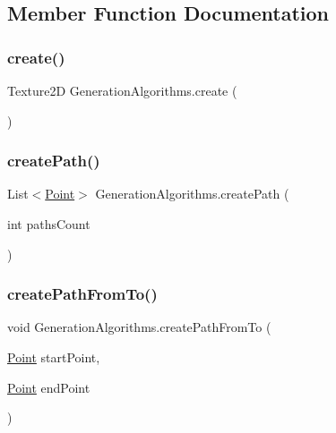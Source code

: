 \subsection{Member Function Documentation}
\mbox{\label{class_generation_algorithms_a0400937de66ac97377508cda8074470b}} 
\subsubsection{\texorpdfstring{create()}{create()}}
{\footnotesize\ttfamily Texture2D Generation\+Algorithms.\+create (\begin{DoxyParamCaption}{ }\end{DoxyParamCaption})}

\mbox{\label{class_generation_algorithms_a40edc3df89ea89a97189093348b712df}} 
\subsubsection{\texorpdfstring{create\+Path()}{createPath()}}
{\footnotesize\ttfamily List$<$\mbox{\hyperlink{class_point}{Point}}$>$ Generation\+Algorithms.\+create\+Path (\begin{DoxyParamCaption}\item[{int}]{paths\+Count }\end{DoxyParamCaption})}

\mbox{\label{class_generation_algorithms_a72d9a98fc09ff078dc75a91710be4aba}} 
\subsubsection{\texorpdfstring{create\+Path\+From\+To()}{createPathFromTo()}}
{\footnotesize\ttfamily void Generation\+Algorithms.\+create\+Path\+From\+To (\begin{DoxyParamCaption}\item[{\mbox{\hyperlink{class_point}{Point}}}]{start\+Point,  }\item[{\mbox{\hyperlink{class_point}{Point}}}]{end\+Point }\end{DoxyParamCaption})}

